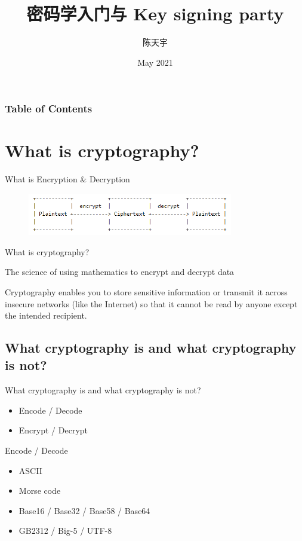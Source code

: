 \documentclass[UTF8]{ctexbeamer}
\title{密码学入门与 Key signing party}
\author[HITLUG]{陈天宇}
\date{May 2021}
\begin{document}
\frame{\titlepage}
\begin{frame}
	\frametitle{Table of Contents}
	\tableofcontents
\end{frame}

\section{What is cryptography?}
\begin{frame}{What is Encryption \& Decryption}
    \begin{figure}
        \centering
        \includegraphics[width=0.8\textwidth]{encryption.png}
    \end{figure}
\end{frame}

\begin{frame}{What is cryptography?}

    The science of using mathematics to encrypt and decrypt data

    Cryptography enables you to store sensitive information or transmit it across insecure networks (like the Internet) so that it cannot be read by anyone except the intended recipient.
    
\end{frame}

\subsection{What cryptography is and what cryptography is not?}
\begin{frame}{What cryptography is and what cryptography is not?}
    \begin{itemize}
        \item Encode / Decode
        \item Encrypt / Decrypt
    \end{itemize}
\end{frame}

\begin{frame}{Encode / Decode}
    \begin{itemize}
        \item ASCII
        \item Morse code
        \item Base16 / Base32 / Base58 / Base64
        \item GB2312 / Big-5 / UTF-8
    \end{itemize}
\end{frame}
\end{document}
